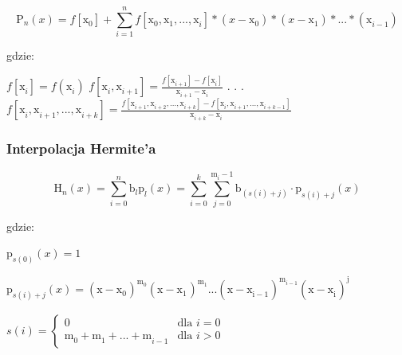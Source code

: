 \documentclass{article}
\begin{document}
\[ \mathrm{P}_{n}^{}(x) = f[\mathrm{x}_{0}^{}] + \sum_{i = 1}^{n}f[\mathrm{x}_{0}^{}, \mathrm{x}_{1}^{}, ..., \mathrm{x}_{i}^{}]*(x - \mathrm{x}_{0}^{})*(x - \mathrm{x}_{1}^{})*...*(\mathrm{x}_{i - 1}^{})\]

\noindent
gdzie:
\bigbreak

\( f[\mathrm{x}_{i}^{}] = f(\mathrm{x}_{i}^{}) \) \newline \indent
\( f[\mathrm{x}_{i}^{}, \mathrm{x}_{i+1}^{}] = \frac{f[\mathrm{x}_{i+1}^{}]-f[\mathrm{x}_{i}^{}]}{\mathrm{x}_{i+1}^{}-\mathrm{x}_{i}^{}} \) \newline \indent
\( . \) \newline \indent
\( . \) \newline \indent
\( . \) \newline \indent
\( f[\mathrm{x}_{i}^{}, \mathrm{x}_{i+1}^{}, ..., \mathrm{x}_{i + k}^{}] =
\frac{f[\mathrm{x}_{i+1}^{}, \mathrm{x}_{i+2}^{}, ..., \mathrm{x}_{i + k}^{}] - f[\mathrm{x}_{i}^{}, \mathrm{x}_{i+1}^{}, ..., \mathrm{x}_{i + k -1}^{}]}{\mathrm{x}_{i+k}^{} - \mathrm{x}_{i}^{}} \) \newline

\subsubsection{Interpolacja Hermite'a}

\[\mathrm{H}_{n}^{}(x) = \sum_{i = 0}^{n}\mathrm{b}_{l}^{}\mathrm{p}_{l}^{}(x) = 
\sum_{i = 0}^{k}\sum_{j=0}^{\mathrm{m}_{i}^{} - 1}\mathrm{b}_{(s(i) + j)}^{} \cdot 
\mathrm{p}_{s(i) + j}^{}(x) \]

\noindent
gdzie:

\bigbreak

\(\mathrm{p}_{s(0)}^{}(x) = 1\) 

\indent

\(\mathrm{p}_{s(i) + j}^{}(x) = \mathrm{(\mathrm{x - \mathrm{x}_{0}^{}}_{}^{})}_{}^{\mathrm{m}_{0}^{}}
\mathrm{(\mathrm{x - \mathrm{x}_{1}^{}}_{}^{})}_{}^{\mathrm{m}_{1}^{}}...
\mathrm{(\mathrm{x - \mathrm{x}_{i - 1}^{}}_{}^{})}_{}^{\mathrm{m}_{i-1}^{}}
\mathrm{(\mathrm{x - \mathrm{x}_{i}^{}}_{}^{})}_{}^{\mathrm{j}_{}^{}}\)

\indent

\(
s(i) = 
\begin{cases}
    0 & \text{dla } i = 0 \\
    \mathrm{m}_{0}^{} + \mathrm{m}_{1}^{} + ... + \mathrm{m}_{i - 1}^{} & \text{dla } i > 0
\end{cases}
\)
\end{document}
